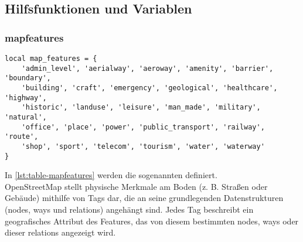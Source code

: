 \subsection{Hilfsfunktionen und Variablen}
\subsubsection{mapfeatures}
\begin{lstlisting}[language={[5.0]Lua}, caption={Deklaration einer lua Tabelle für die mapfeatures},label={lst:table-mapfeatures}]
local map_features = {
	'admin_level', 'aerialway', 'aeroway', 'amenity', 'barrier', 'boundary',
	'building', 'craft', 'emergency', 'geological', 'healthcare', 'highway',
	'historic', 'landuse', 'leisure', 'man_made', 'military', 'natural',
	'office', 'place', 'power', 'public_transport', 'railway', 'route',
	'shop', 'sport', 'telecom', 'tourism', 'water', 'waterway'
}
\end{lstlisting}
In \autoref{lst:table-mapfeatures} werden die sogenannten \cite{osm-mapfeatures} definiert. \\
OpenStreetMap stellt physische Merkmale am Boden (z. B. Straßen oder Gebäude) mithilfe von Tags dar, die an seine grundlegenden Datenstrukturen (nodes, ways und relations) angehängt sind. Jedes Tag beschreibt ein geografisches Attribut des Features, das von diesem bestimmten nodes, ways oder dieser relations angezeigt wird.

